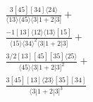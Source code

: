 \documentclass[varwidth, border=5pt]{standalone}
\begin{document}
\begin{my}
$\begin{gathered}
\scriptscriptstyle\frac{3[45][34]⟨24⟩}{⟨13⟩⟨45⟩⟨3|1+2|3]}+\\
\scriptscriptstyle\frac{-1[13]⟨12⟩⟨13⟩[15]}{⟨15⟩⟨34⟩^2⟨3|1+2|3]}+\\
\scriptscriptstyle\frac{3/2[13][45][35]⟨25⟩}{⟨45⟩⟨3|1+2|3]^2}+\\
\scriptscriptstyle\frac{3[45][13]⟨23⟩[35][34]}{⟨3|1+2|3]^3}\phantom{+}
\end{gathered}$
\end{my}
\end{document}
